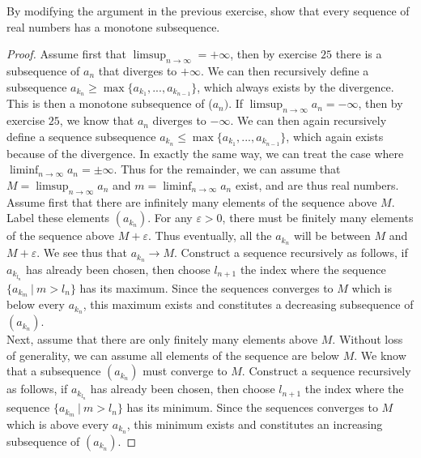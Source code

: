 \begin{exercise}{28}
By modifying the argument in the previous exercise, show that every sequence of real numbers has a monotone subsequence.
\end{exercise}
\begin{proof}
    Assume first that $\limsup_{n\rightarrow \infty} = +\infty$, then by exercise $25$ there is a subsequence of $a_n$ that diverges to $+\infty$. We can then recursively define a subsequence $a_{k_n}\geq \max\{a_{k_1},...,a_{k_{n-1}}\}$, which always exists by the divergence. This is then a monotone subsequence of ($a_n)$. If $\limsup_{n\rightarrow \infty} a_n = -\infty$, then by exercise $25$, we know that $a_n$ diverges to $-\infty$. We can then again recursively define a sequence subsequence $a_{k_n}\leq \max\{a_{k_1},...,a_{k_{n-1}}\}$, which again exists because of the divergence. In exactly the same way, we can treat the case where $\liminf_{n\rightarrow \infty} a_n = \pm\infty$. Thus for the remainder, we can assume that $M = \limsup_{n\rightarrow \infty} a_n$ and $m = \liminf_{n\rightarrow \infty} a_n$ exist, and are thus real numbers.\\

    Assume first that there are infinitely many elements of the sequence above $M$. Label these elements $(a_{k_n})$. For any $\varepsilon>0$, there must be finitely many elements of the sequence above $M+\varepsilon$. Thus eventually, all the $a_{k_n}$ will be between $M$ and $M+\varepsilon$. We see thus that $a_{k_n}\rightarrow M$. Construct a sequence recursively as follows, if $a_{k_{l_n}}$ has already been chosen, then choose $l_{n+1}$ the index where the sequence $\{a_{k_m}~\vert~m> l_n\}$ has its maximum. Since the sequences converges to $M$ which is below every $a_{k_n}$, this maximum exists and constitutes a decreasing subsequence of $(a_{k_n})$.\\

    Next, assume that there are only finitely many elements above $M$. Without loss of generality, we can assume all elements of the sequence are below $M$. We know that a subsequence $(a_{k_n})$ must converge to $M$.  Construct a sequence recursively as follows, if $a_{k_{l_n}}$ has already been chosen, then choose $l_{n+1}$ the index where the sequence $\{a_{k_m}~\vert~m> l_n\}$ has its minimum. Since the sequences converges to $M$ which is above every $a_{k_n}$, this minimum exists and constitutes an increasing subsequence of $(a_{k_n})$.
\end{proof}

